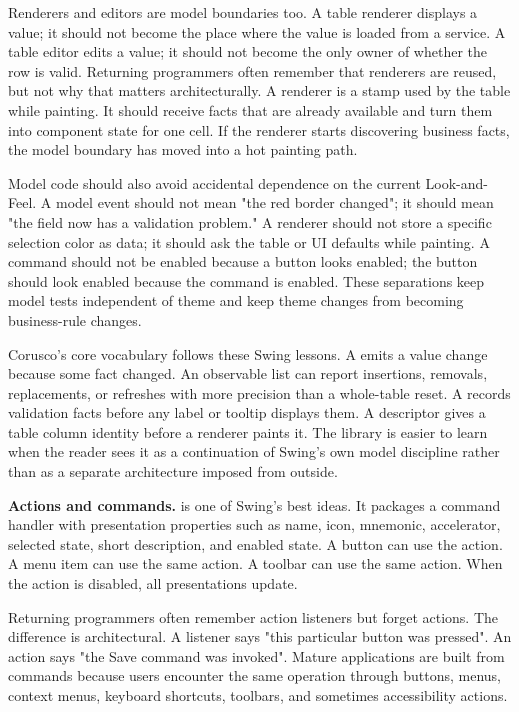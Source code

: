 Renderers and editors are model boundaries too. A table renderer displays a
value; it should not become the place where the value is loaded from a service.
A table editor edits a value; it should not become the only owner of whether
the row is valid. Returning programmers often remember that renderers are
reused, but not why that matters architecturally. A renderer is a stamp used by
the table while painting. It should receive facts that are already available and
turn them into component state for one cell. If the renderer starts discovering
business facts, the model boundary has moved into a hot painting path.

Model code should also avoid accidental dependence on the current
Look-and-Feel. A model event should not mean "the red border changed"; it should
mean "the field now has a validation problem." A renderer should not store a
specific selection color as data; it should ask the table or UI defaults while
painting. A command should not be enabled because a button looks enabled; the
button should look enabled because the command is enabled. These separations
keep model tests independent of theme and keep theme changes from becoming
business-rule changes.

Corusco's core vocabulary follows these Swing lessons. A 
emits a value change because some fact changed. An observable list can report
insertions, removals, replacements, or refreshes with more precision than a
whole-table reset. A  records validation facts before any label
or tooltip displays them. A descriptor gives a table column identity before a
renderer paints it. The library is easier to learn when the reader sees it as a
continuation of Swing's own model discipline rather than as a separate
architecture imposed from outside.

\textbf{Actions and commands.}  is one of Swing's best ideas. It packages a command handler with presentation properties such as name, icon, mnemonic, accelerator, selected state, short description, and enabled state. A button can use the action. A menu item can use the same action. A toolbar can use the same action. When the action is disabled, all presentations update.

Returning programmers often remember action listeners but forget actions. The difference is architectural. A listener says "this particular button was pressed". An action says "the Save command was invoked". Mature applications are built from commands because users encounter the same operation through buttons, menus, context menus, keyboard shortcuts, toolbars, and sometimes accessibility actions.

